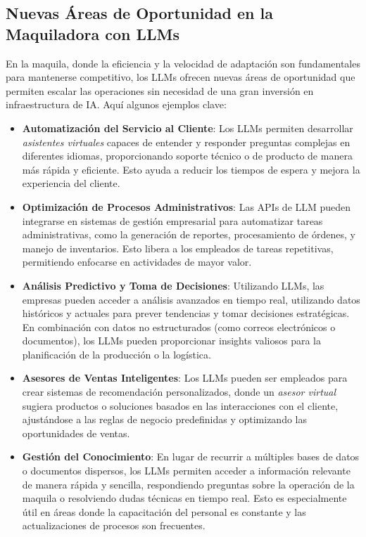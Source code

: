 \subsection{Nuevas Áreas de Oportunidad en la Maquiladora con LLMs}

En la maquila, donde la eficiencia y la velocidad de adaptación son fundamentales para mantenerse competitivo, los LLMs ofrecen nuevas áreas de oportunidad que permiten escalar las operaciones sin necesidad de una gran inversión en infraestructura de IA. Aquí algunos ejemplos clave:

\begin{itemize}
    \item \textbf{Automatización del Servicio al Cliente}: Los LLMs permiten desarrollar \textit{asistentes virtuales} capaces de entender y responder preguntas complejas en diferentes idiomas, proporcionando soporte técnico o de producto de manera más rápida y eficiente. Esto ayuda a reducir los tiempos de espera y mejora la experiencia del cliente.
    
    \item \textbf{Optimización de Procesos Administrativos}: Las APIs de LLM pueden integrarse en sistemas de gestión empresarial para automatizar tareas administrativas, como la generación de reportes, procesamiento de órdenes, y manejo de inventarios. Esto libera a los empleados de tareas repetitivas, permitiendo enfocarse en actividades de mayor valor.
    
    \item \textbf{Análisis Predictivo y Toma de Decisiones}: Utilizando LLMs, las empresas pueden acceder a análisis avanzados en tiempo real, utilizando datos históricos y actuales para prever tendencias y tomar decisiones estratégicas. En combinación con datos no estructurados (como correos electrónicos o documentos), los LLMs pueden proporcionar insights valiosos para la planificación de la producción o la logística.
    
    \item \textbf{Asesores de Ventas Inteligentes}: Los LLMs pueden ser empleados para crear sistemas de recomendación personalizados, donde un \textit{asesor virtual} sugiera productos o soluciones basados en las interacciones con el cliente, ajustándose a las reglas de negocio predefinidas y optimizando las oportunidades de ventas.
    
    \item \textbf{Gestión del Conocimiento}: En lugar de recurrir a múltiples bases de datos o documentos dispersos, los LLMs permiten acceder a información relevante de manera rápida y sencilla, respondiendo preguntas sobre la operación de la maquila o resolviendo dudas técnicas en tiempo real. Esto es especialmente útil en áreas donde la capacitación del personal es constante y las actualizaciones de procesos son frecuentes.
\end{itemize}

